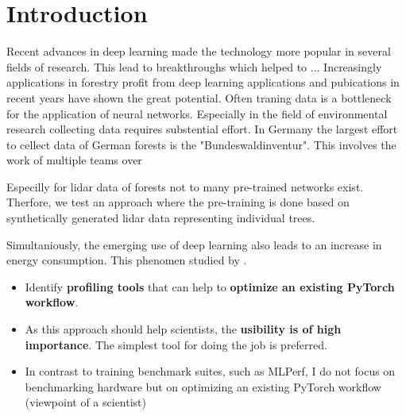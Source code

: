 \documentclass[12pt, a4paper, hidelinks]{article}
\begin{document}
\thispagestyle{plain}
\newpage


\setcounter{page}{1}
\pagestyle{fancy}


\section{Introduction}

Recent advances in deep learning made the technology more popular in several fields of research.
This lead to breakthroughs which helped to ...
Increasingly applications in forestry profit from deep learning applications and pubications in recent years have shown the great potential. Often traning data is a bottleneck for the application of neural networks. Especially in the field of environmental research collecting data requires substential effort. In Germany the largest effort to cellect data of German forests is the "Bundeswaldinventur". This involves the work of multiple teams over 

Especilly for lidar data of forests not to many pre-trained networks exist. Therfore, we test an approach where the pre-training is done based on synthetically generated lidar data representing individual trees.

Simultaniously, the emerging use of deep learning also leads to an increase in energy consumption. This phenomen studied by \cite{20220610_dodge_measuring-the-carbon-intensity-of-ai-in-cloud-instances}. 


\cite{white_2016_als-forest-inventory}
\cite{uba_2020_waldumbau}

\begin{itemize}
    \item Identify \textbf{profiling tools} that can help to \textbf{optimize an existing PyTorch workflow}.
    \item As this approach should help scientists, the \textbf{usibility is of high importance}. The simplest tool for doing the job is preferred.
    \item In contrast to training benchmark suites, such as MLPerf, I do not focus on benchmarking hardware but on optimizing an existing PyTorch workflow (viewpoint of a scientist)
\end{itemize}
\end{document}
